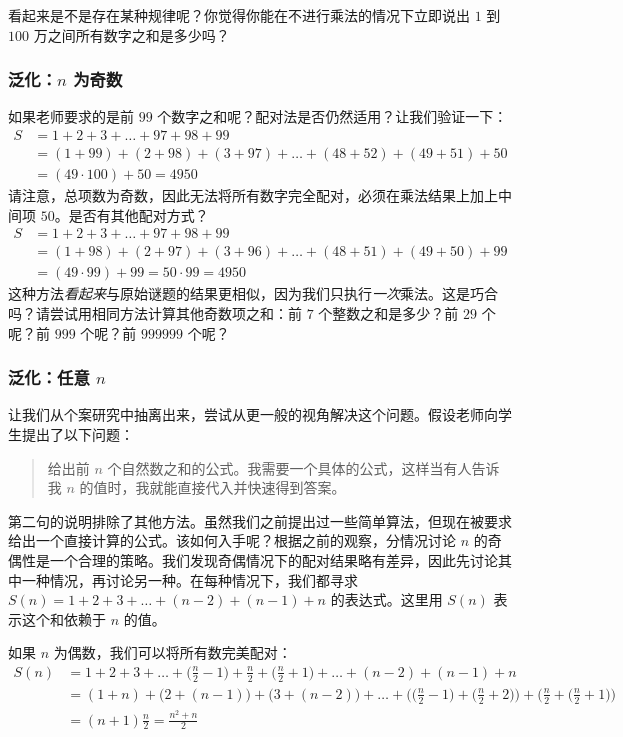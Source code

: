 看起来是不是存在某种规律呢？你觉得你能在不进行乘法的情况下立即说出 $1$ 到 $100$ 万之间所有数字之和是多少吗？

\subsubsection*{泛化：$n$ 为奇数}

如果老师要求的是前 $99$ 个数字之和呢？配对法是否仍然适用？让我们验证一下：
\begin{align*}
    S &= 1 + 2 + 3 + \dots + 97 + 98 + 99 \\
    &= (1 + 99) + (2 + 98) + (3 + 97) + \dots + (48 + 52) + (49 + 51) + 50 \\
    &= (49 \cdot 100) + 50 = 4950
\end{align*}
请注意，总项数为奇数，因此无法将所有数字完全配对，必须在乘法结果上加上中间项 $50$。是否有其他配对方式？
\begin{align*}
    S &= 1 + 2 + 3 + \dots + 97 + 98 + 99 \\
    &= (1 + 98) + (2 + 97) + (3 + 96) + \dots + (48 + 51) + (49 + 50) + 99 \\
    &= (49 \cdot 99) + 99 = 50 \cdot 99 = 4950
\end{align*}
这种方法\emph{看起来}与原始谜题的结果更相似，因为我们只执行\emph{一次}乘法。这是巧合吗？请尝试用相同方法计算其他奇数项之和：前 $7$ 个整数之和是多少？前 $29$ 个呢？前 $999$ 个呢？前 $999999$ 个呢？

\subsubsection*{泛化：任意 $n$}

让我们从个案研究中抽离出来，尝试从更一般的视角解决这个问题。假设老师向学生提出了以下问题：
\begin{quote}
    给出前 $n$ 个自然数之和的公式。我需要一个具体的公式，这样当有人告诉我 $n$ 的值时，我就能直接代入并快速得到答案。
\end{quote}

第二句的说明排除了其他方法。虽然我们之前提出过一些简单算法，但现在被要求给出一个直接计算的公式。该如何入手呢？根据之前的观察，分情况讨论 $n$ 的奇偶性是一个合理的策略。我们发现奇偶情况下的配对结果略有差异，因此先讨论其中一种情况，再讨论另一种。在每种情况下，我们都寻求 $S(n) = 1 + 2 + 3 + \dots + (n - 2) + (n - 1) + n$ 的表达式。这里用 $S(n)$ 表示这个和依赖于 $n$ 的值。

如果 $n$ 为偶数，我们可以将所有数完美配对：
\begin{align*}
    S(n) &= 1 + 2 + 3 + \dots + \Big(\frac{n}{2}-1\Big) + \frac{n}{2} + \Big(\frac{n}{2}+1\Big) + \dots + (n - 2) + (n - 1) + n\\
    &=  (1 + n) + \big(2 + (n - 1)\big) + \big(3 + (n - 2)\big) + \dots + \Big(\big(\frac{n}{2}-1\big)+\big(\frac{n}{2}+2\big)\Big) + \Big(\frac{n}{2}+\big(\frac{n}{2}+1\big)\Big) \\
    &= (n+1)\frac{n}{2} = \frac{n^2+n}{2}
\end{align*}

